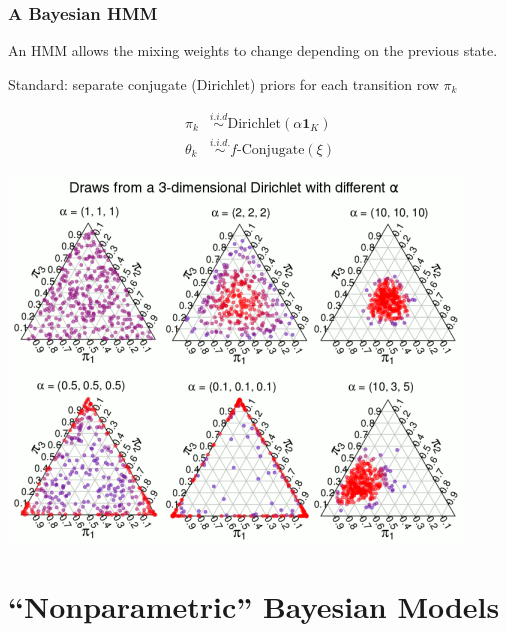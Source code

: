 \documentclass[11pt, mathserif, handout, table]{beamer}
\begin{document}
\begin{frame}
  \frametitle{A Bayesian HMM}
An HMM allows the mixing weights to change depending on the previous
state.

\vspace{0.2in}
Standard: separate conjugate (Dirichlet) priors for each transition row $\pi_k$
\begin{minipage}{0.45\textwidth}
\begin{align*}
  \label{eq:5}
  \pi_k &\stackrel{i.i.d}{\sim} \mathrm{Dirichlet}(\alpha\mathbf{1}_K) \\
  \theta_k &\stackrel{i.i.d.}{\sim} f\text{-}\mathrm{Conjugate}(\xi)
\end{align*}
\end{minipage}
\hspace{0.1in}
\begin{minipage}{0.45\textwidth}
\begin{center}
  \includegraphics[width=\textwidth]{img/dirichlet.png}
\end{center}
\end{minipage}
\end{frame}
\section{``Nonparametric'' Bayesian Models}
\end{document}
